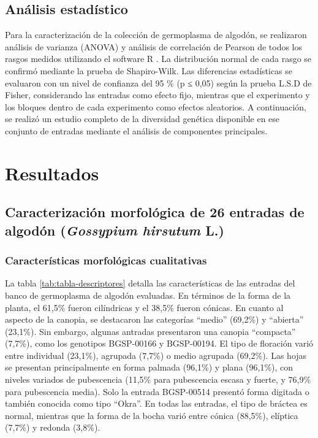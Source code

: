 \documentclass[12pt,oneside]{reedthesis}
\begin{document}
\subsection{Análisis estadístico}\label{anuxe1lisis-estaduxedstico}

Para la caracterización de la colección de germoplasma de algodón, se realizaron análisis de varianza (ANOVA) y análisis de correlación de Pearson de todos los rasgos medidos utilizando el software R \autocite{R2024}. La distribución normal de cada rasgo se confirmó mediante la prueba de Shapiro-Wilk. Las diferencias estadísticas se evaluaron con un nivel de confianza del 95 \% (p ≤ 0,05) según la prueba L.S.D de Fisher, considerando las entradas como efecto fijo, mientras que el experimento y los bloques dentro de cada experimento como efectos aleatorios. A continuación, se realizó un estudio completo de la diversidad genética disponible en ese conjunto de entradas mediante el análisis de componentes principales.

\section{Resultados}\label{resultados}

\subsection{\texorpdfstring{Caracterización morfológica de 26 entradas de algodón (\emph{Gossypium hirsutum} L.)}{Caracterización morfológica de 26 entradas de algodón (Gossypium hirsutum L.)}}\label{caracterizaciuxf3n-morfoluxf3gica-de-26-entradas-de-algoduxf3n-gossypium-hirsutum-l.-1}

\subsubsection{Características morfológicas cualitativas}\label{caracteruxedsticas-morfoluxf3gicas-cualitativas}

La tabla \ref{tab:tabla-descriptores} detalla las características de las entradas del banco de germoplasma de algodón evaluadas. En términos de la forma de la planta, el 61,5\% fueron cilíndricas y el 38,5\% fueron cónicas. En cuanto al aspecto de la canopia, se destacaron las categorías ``medio'' (69,2\%) y ``abierta'' (23,1\%). Sin embargo, algunas antradas presentaron una canopia ``compacta'' (7,7\%), como los genotipos BGSP-00166 y BGSP-00194. El tipo de floración varió entre individual (23,1\%), agrupada (7,7\%) o medio agrupada (69,2\%). Las hojas se presentan principalmente en forma palmada (96,1\%) y plana (96,1\%), con niveles variados de pubescencia (11,5\% para pubescencia escasa y fuerte, y 76,9\% para pubescencia media). Solo la entrada BGSP-00514 presentó forma digitada o también conocida como tipo ``Okra''. En todas las entradas, el tipo de bráctea es normal, mientras que la forma de la bocha varió entre cónica (88,5\%), elíptica (7,7\%) y redonda (3,8\%).
\end{document}
